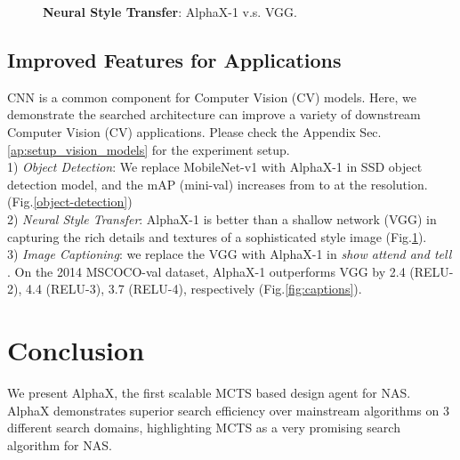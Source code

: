 \documentclass[10pt,twocolumn,letterpaper]{article}
\begin{document}
\begin{figure}[t]
\begin{center}
\caption{ \textbf{Neural Style Transfer}: AlphaX-1 v.s. VGG.}
\vspace{-0.2in}
\end{center}
\label{neural-style-transfer}
\vspace{-0.2in}
\end{figure}



\subsection{Improved Features for Applications}

CNN is a common component for Computer Vision (CV) models. Here, we demonstrate the searched architecture can improve a variety of downstream Computer Vision (CV) applications. Please check the Appendix Sec.\ref{ap:setup_vision_models} for the experiment setup. \\
1) \textit{Object Detection}: We replace MobileNet-v1 with AlphaX-1 in SSD \cite{liu2016ssd} object detection model, and the mAP (mini-val) increases from  to  at the  resolution. (Fig.\ref{object-detection}) \\
2) \textit{Neural Style Transfer}: AlphaX-1 is better than a shallow network (VGG) in capturing the rich details and textures of a sophisticated style image (Fig.\ref{neural-style-transfer}). \\
3) \textit{Image Captioning}: we replace the VGG with AlphaX-1 in \textit{show attend and tell} \cite{xu2015show}. On the 2014 MSCOCO-val dataset, AlphaX-1 outperforms VGG by 2.4 (RELU-2), 4.4 (RELU-3), 3.7 (RELU-4), respectively (Fig.\ref{fig:captions}).

\section{Conclusion}
We present AlphaX, the first scalable MCTS based design agent for NAS. AlphaX demonstrates superior search efficiency over mainstream algorithms on 3 different search domains, highlighting MCTS as a very promising search algorithm for NAS.
\end{document}
